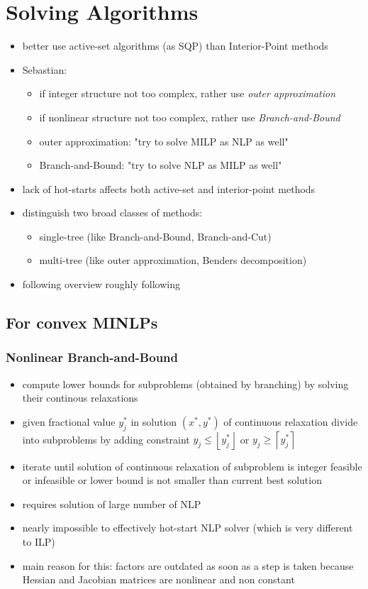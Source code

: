 \documentclass{article}
\begin{document}
\section{Solving Algorithms}
\begin{itemize}
\item better use active-set algorithms (as SQP) than Interior-Point methods
\item Sebastian: 
\begin{itemize}
\item if integer structure not too complex, rather use \textit{outer approximation}
\item if nonlinear structure not too complex, rather use \textit{Branch-and-Bound}
\item outer approximation: "try to solve MILP as NLP as well"
\item Branch-and-Bound: "try to solve NLP as MILP as well"
\end{itemize}
\item lack of hot-starts affects both active-set and interior-point methods
\item distinguish two broad classes of methods: 
\begin{itemize}
\item single-tree (like Branch-and-Bound, Branch-and-Cut) 
\item multi-tree (like outer approximation, Benders decomposition)
\end{itemize}
\item following overview roughly following \cite{d2013mixed}
\end{itemize}

\subsection{For convex MINLPs}
\subsubsection{Nonlinear Branch-and-Bound}
\begin{itemize}
\item compute lower bounds for subproblems (obtained by branching) by solving their continous relaxations
\item given fractional value $y_j^*$ in solution $(x^*,y^*)$ of continuous relaxation divide into subproblems by adding constraint $y_j \leq \left \lfloor{y_j^*}\right \rfloor$ or $y_j \geq \left \lceil{y_j^*}\right \rceil$ 
\item iterate until solution of continuous relaxation of subproblem is integer feasible or infeasible or lower bound is not smaller than current best solution
\item requires solution of large number of NLP
\item nearly impossible to effectively hot-start NLP solver (which is very different to ILP)
\item main reason for this: factors are outdated as soon as a step is taken because Hessian and Jacobian matrices are nonlinear and non constant
\end{itemize}
\end{document}
